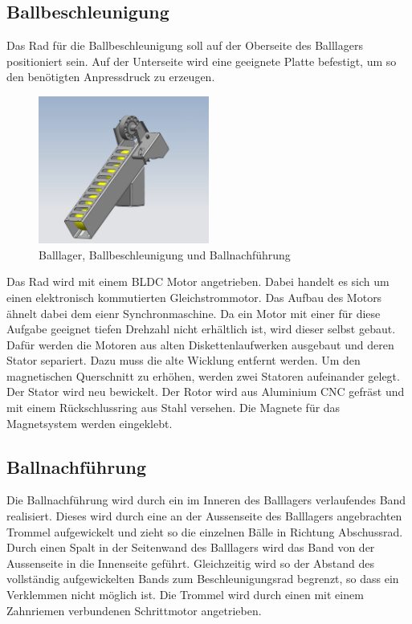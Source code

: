 \subsection{Ballbeschleunigung}
Das Rad für die Ballbeschleunigung soll auf der Oberseite des Balllagers 
positioniert sein. Auf der Unterseite wird eine geeignete Platte befestigt, um 
so den benötigten Anpressdruck zu erzeugen. 
\begin{figure}[h!]          
	\centering             
	\includegraphics[width=0.5\textwidth]{fig/Balllager.jpg}    
	\caption{Balllager, Ballbeschleunigung und Ballnachführung}
	\label{fig:Balllager} 
\end{figure}
Das Rad wird mit einem BLDC Motor angetrieben. Dabei handelt es sich um einen 
elektronisch kommutierten Gleichstrommotor. Das Aufbau des Motors ähnelt dabei 
dem eienr Synchronmaschine. Da ein Motor mit einer für diese Aufgabe geeignet 
tiefen Drehzahl nicht erhältlich ist, wird dieser selbst gebaut. Dafür werden 
die Motoren aus alten Diskettenlaufwerken ausgebaut und deren Stator separiert. 
Dazu muss die alte Wicklung entfernt werden. Um den magnetischen Querschnitt 
zu erhöhen, werden zwei Statoren aufeinander gelegt. Der Stator wird neu 
bewickelt. Der Rotor wird aus Aluminium CNC gefräst und mit einem 
Rückschlussring aus Stahl versehen. Die Magnete für das Magnetsystem werden 
eingeklebt. 

\subsection{Ballnachführung}
Die Ballnachführung wird durch ein im Inneren des Balllagers verlaufendes Band 
realisiert. Dieses wird durch eine an der Aussenseite des Balllagers 
angebrachten Trommel aufgewickelt und zieht so die einzelnen Bälle in Richtung 
Abschussrad. Durch einen Spalt in der Seitenwand des Balllagers wird das Band 
von der Aussenseite in die Innenseite geführt. Gleichzeitig wird so der 
Abstand des vollständig aufgewickelten Bands zum Beschleunigungsrad begrenzt, 
so dass ein Verklemmen nicht möglich ist.
Die Trommel wird durch einen mit einem Zahnriemen verbundenen Schrittmotor angetrieben.

